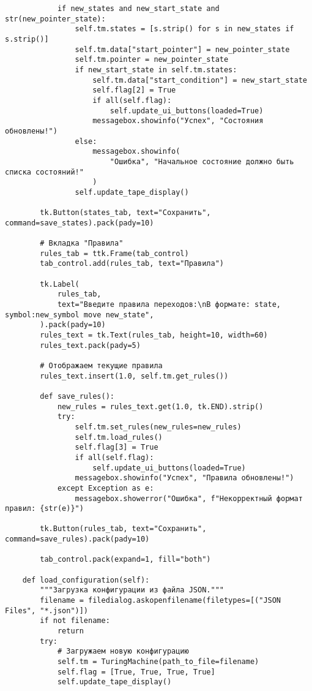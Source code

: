 \begin{lstlisting}
            if new_states and new_start_state and str(new_pointer_state):
                self.tm.states = [s.strip() for s in new_states if s.strip()]
                self.tm.data["start_pointer"] = new_pointer_state
                self.tm.pointer = new_pointer_state
                if new_start_state in self.tm.states:
                    self.tm.data["start_condition"] = new_start_state
                    self.flag[2] = True
                    if all(self.flag):
                        self.update_ui_buttons(loaded=True)
                    messagebox.showinfo("Успех", "Состояния обновлены!")
                else:
                    messagebox.showinfo(
                        "Ошибка", "Начальное состояние должно быть списка состояний!"
                    )
                self.update_tape_display()

        tk.Button(states_tab, text="Сохранить", command=save_states).pack(pady=10)

        # Вкладка "Правила"
        rules_tab = ttk.Frame(tab_control)
        tab_control.add(rules_tab, text="Правила")

        tk.Label(
            rules_tab,
            text="Введите правила переходов:\nВ формате: state, symbol:new_symbol move new_state",
        ).pack(pady=10)
        rules_text = tk.Text(rules_tab, height=10, width=60)
        rules_text.pack(pady=5)

        # Отображаем текущие правила
        rules_text.insert(1.0, self.tm.get_rules())

        def save_rules():
            new_rules = rules_text.get(1.0, tk.END).strip()
            try:
                self.tm.set_rules(new_rules=new_rules)
                self.tm.load_rules()
                self.flag[3] = True
                if all(self.flag):
                    self.update_ui_buttons(loaded=True)
                messagebox.showinfo("Успех", "Правила обновлены!")
            except Exception as e:
                messagebox.showerror("Ошибка", f"Некорректный формат правил: {str(e)}")

        tk.Button(rules_tab, text="Сохранить", command=save_rules).pack(pady=10)

        tab_control.pack(expand=1, fill="both")

    def load_configuration(self):
        """Загрузка конфигурации из файла JSON."""
        filename = filedialog.askopenfilename(filetypes=[("JSON Files", "*.json")])
        if not filename:
            return
        try:
            # Загружаем новую конфигурацию
            self.tm = TuringMachine(path_to_file=filename)
            self.flag = [True, True, True, True]
            self.update_tape_display()


\end{lstlisting}
